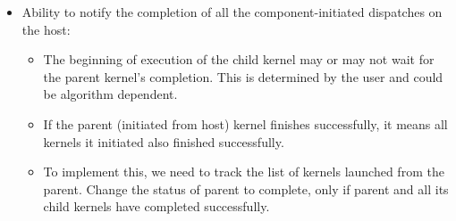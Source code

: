 \documentclass[draft]{book}
\begin{document}
\begin{appendices}
\begin{itemize}
\item Ability to notify the completion of all the component-\/initiated
  dispatches on the host:

\begin{itemize}
\item The beginning of execution of the child kernel may or may not wait for the
  parent kernel's completion. This is determined by the user and could be
  algorithm dependent.
\item If the parent (initiated from host) kernel finishes successfully, it means
  all kernels it initiated also finished successfully.
\item To implement this, we need to track the list of kernels launched from the
  parent. Change the status of parent to complete, only if parent and all its
  child kernels have completed successfully.
\end{itemize}
\end{itemize}


\end{appendices}
\end{document}
